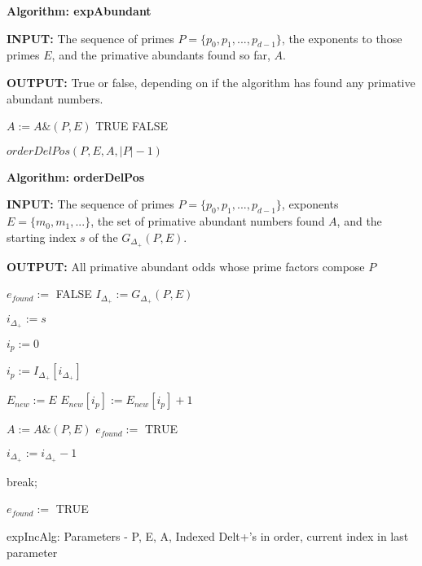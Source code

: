 \documentclass[../paper.tex]{subfiles}
\begin{document}
{\setlength{\parindent}{0cm}

\textbf{Algorithm: expAbundant}

\textbf{INPUT:} The sequence of primes 
$P = \{p_0, p_1, ..., p_{d-1}\}$, the exponents to those 
primes $E$, and the primative abundants found so far, $A$.

\textbf{OUTPUT:} True or false, depending on if the algorithm has found any
primative abundant numbers.

}

\begin{algorithmic}
		\STATE $A := A \& (P,E)$
		\RETURN TRUE
	\ENDIF
	\RETURN FALSE
\ENDIF

\RETURN $orderDelPos(P,E,A,|P| - 1)$

\end{algorithmic}

{\setlength{\parindent}{0cm}

\textbf{Algorithm: orderDelPos}

\textbf{INPUT:} The sequence of primes 
$P = \{p_0, p_1, ..., p_{d-1}\}$, exponents $E = \{ m_0, m_1,
...\}$, the set of primative abundant numbers found $A$,
and the starting index $s$ of the $G_{\Delta_{+}}(P,E)$.

\textbf{OUTPUT:} All primative abundant odds whose prime factors
compose $P$

}


\begin{algorithmic}

\STATE $e_{found} :=$ FALSE
\STATE $I_{\Delta_{+}} := G_{ \Delta_{+}}(P,E)$

\STATE $i_{\Delta_{+}} := s$ %

\STATE $i_p := 0$ %

	\STATE $i_p := I_{\Delta_{+}}[ i_{\Delta_{+}} ]$


		\STATE {}
		\STATE $E_{new} := E$
		\STATE $E_{new}[ i_p ] := E_{new}[ i_p ] + 1 $
		
			\STATE $A := A\&(P,E)$
			\STATE $e_{found} := $ TRUE
		\ENDIF

		\STATE $i_{\Delta_{+}} := i_{\Delta_{+}} - 1$  
	
	\ELSE
		\STATE break;
	\ENDIF
\ENDWHILE


	\STATE {}
		\STATE $e_{found} := $ TRUE
	\ENDIF
\ENDIF

\end{algorithmic}
expIncAlg: Parameters - P, E, A, Indexed Delt+'s in order, current index
in last parameter
\end{document}
